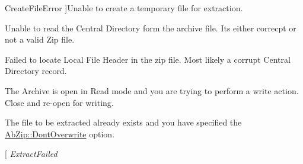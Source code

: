 \begin{Desc}
\begin{description}
{Create\+File\+Error\hypertarget{class_ab_zip_ac669c2fce0fbde75677d12711c11c504aa084f0a8084c9602eea2ab75bc10ede9}{}\label{class_ab_zip_ac669c2fce0fbde75677d12711c11c504aa084f0a8084c9602eea2ab75bc10ede9}
}]Unable to create a temporary file for extraction. \item[{\em 
Invalid\+Archive\hypertarget{class_ab_zip_ac669c2fce0fbde75677d12711c11c504ace462f90eb1cedae9a3c57ab06048b1c}{}\label{class_ab_zip_ac669c2fce0fbde75677d12711c11c504ace462f90eb1cedae9a3c57ab06048b1c}
}]Unable to read the Central Directory form the archive file. It\textquotesingle{}s either correcpt or not a valid Zip file. \item[{\em 
Seek\+Error\hypertarget{class_ab_zip_ac669c2fce0fbde75677d12711c11c504a501e9909cf9ff21a190916fa9ba04d24}{}\label{class_ab_zip_ac669c2fce0fbde75677d12711c11c504a501e9909cf9ff21a190916fa9ba04d24}
}]Failed to locate Local File Header in the zip file. Most likely a corrupt Central Directory record. \item[{\em 
Open\+In\+Read\+Only\hypertarget{class_ab_zip_ac669c2fce0fbde75677d12711c11c504a67c493072811f65bc610ba548c1a58c7}{}\label{class_ab_zip_ac669c2fce0fbde75677d12711c11c504a67c493072811f65bc610ba548c1a58c7}
}]The Archive is open in Read mode and you are trying to perform a write action. Close and re-\/open for writing. \item[{\em 
File\+Exists\hypertarget{class_ab_zip_ac669c2fce0fbde75677d12711c11c504abf9ead9668e2736dabaf19715a34b91e}{}\label{class_ab_zip_ac669c2fce0fbde75677d12711c11c504abf9ead9668e2736dabaf19715a34b91e}
}]The file to be extracted already exists and you have specified the \hyperlink{class_ab_zip_a9c4f57d6b8d9a449c2eb6c4d4e53c9d5afe12bba10bd24a3bf1da93500fd5c401}{Ab\+Zip\+::\+Dont\+Overwrite} option. \item[{\em 
Extract\+Failed\hypertarget{class_ab_zip_ac669c2fce0fbde75677d12711c11c504afd59228859ee6670b7ecd0c4c59db347}{}\label{class_ab_zip_ac669c2fce0fbde75677d12711c11c504afd59228859ee6670b7ecd0c4c59db347}
}
\end{description}
\end{Desc}
